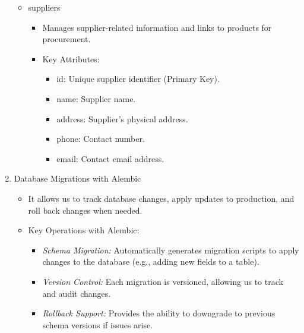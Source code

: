 \documentclass{llncs}
\begin{document}
\begin{enumerate}
\begin{itemize}
\begin{itemize}
\begin{itemize}
                              \end{itemize}
                    \end{itemize}
              \item suppliers
                    \begin{itemize}
                        \item Manages supplier-related information and links to products for procurement.
                        \item Key Attributes:
                              \begin{itemize}
                                  \item id: Unique supplier identifier (Primary Key).
                                  \item name: Supplier name.
                                  \item address: Supplier’s physical address.
                                  \item phone: Contact number.
                                  \item email: Contact email address.

                              \end{itemize}
                    \end{itemize}
          \end{itemize}
    \item  Database Migrations with Alembic \\
          \begin{itemize}
              \item It allows us to track database changes, apply updates to production, and roll back changes when needed.
              \item Key Operations with Alembic:
                    \begin{itemize}
                        \item \textit{Schema Migration:} Automatically generates migration scripts to apply changes to the database (e.g., adding new fields to a table).
                        \item \textit{Version Control:} Each migration is versioned, allowing us to track and audit changes.
                        \item \textit{Rollback Support:} Provides the ability to downgrade to previous schema versions if issues arise.
                    \end{itemize}
          \end{itemize}
\end{enumerate}
\end{document}
